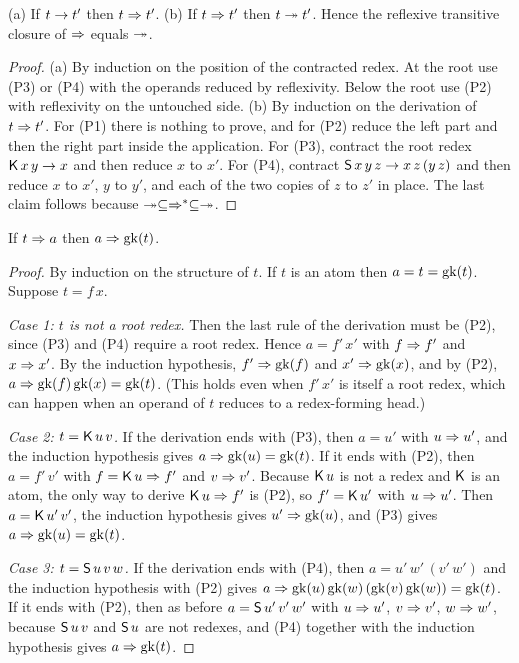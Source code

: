 \begin{lemma}[Inclusions]\label{lem:inclusions}
(a) If $t\rightarrow t'$ then $t\Rightarrow t'$. (b) If $t\Rightarrow t'$ then $t\twoheadrightarrow t'$. Hence the reflexive transitive closure of $\Rightarrow$ equals $\twoheadrightarrow$.
\end{lemma}

\begin{proof}
(a) By induction on the position of the contracted redex. At the root use (P3) or (P4) with the operands reduced by reflexivity. Below the root use (P2) with reflexivity on the untouched side. (b) By induction on the derivation of $t\Rightarrow t'$. For (P1) there is nothing to prove, and for (P2) reduce the left part and then the right part inside the application. For (P3), contract the root redex $\mathsf{K}\,x\,y\rightarrow x$ and then reduce $x$ to $x'$. For (P4), contract $\mathsf{S}\,x\,y\,z\rightarrow x\,z\,(y\,z)$ and then reduce $x$ to $x'$, $y$ to $y'$, and each of the two copies of $z$ to $z'$ in place. The last claim follows because $\twoheadrightarrow\subseteq\Rightarrow^*\subseteq\twoheadrightarrow$.
\end{proof}

\begin{lemma}\label{lem:triangle}
If $t\Rightarrow a$ then $a\Rightarrow\mathrm{gk}(t)$.
\end{lemma}

\begin{proof}
By induction on the structure of $t$. If $t$ is an atom then $a=t=\mathrm{gk}(t)$. Suppose $t=f\,x$.

\emph{Case 1: $t$ is not a root redex.} Then the last rule of the derivation must be (P2), since (P3) and (P4) require a root redex. Hence $a=f'\,x'$ with $f\Rightarrow f'$ and $x\Rightarrow x'$. By the induction hypothesis, $f'\Rightarrow\mathrm{gk}(f)$ and $x'\Rightarrow\mathrm{gk}(x)$, and by (P2), $a\Rightarrow\mathrm{gk}(f)\,\mathrm{gk}(x)=\mathrm{gk}(t)$. (This holds even when $f'\,x'$ is itself a root redex, which can happen when an operand of $t$ reduces to a redex-forming head.)

\emph{Case 2: $t=\mathsf{K}\,u\,v$.} If the derivation ends with (P3), then $a=u'$ with $u\Rightarrow u'$, and the induction hypothesis gives $a\Rightarrow\mathrm{gk}(u)=\mathrm{gk}(t)$. If it ends with (P2), then $a=f'\,v'$ with $f=\mathsf{K}\,u\Rightarrow f'$ and $v\Rightarrow v'$. Because $\mathsf{K}\,u$ is not a redex and $\mathsf{K}$ is an atom, the only way to derive $\mathsf{K}\,u\Rightarrow f'$ is (P2), so $f'=\mathsf{K}\,u'$ with $u\Rightarrow u'$. Then $a=\mathsf{K}\,u'\,v'$, the induction hypothesis gives $u'\Rightarrow\mathrm{gk}(u)$, and (P3) gives $a\Rightarrow\mathrm{gk}(u)=\mathrm{gk}(t)$.

\emph{Case 3: $t=\mathsf{S}\,u\,v\,w$.} If the derivation ends with (P4), then $a=u'\,w'\,(v'\,w')$ and the induction hypothesis with (P2) gives $a\Rightarrow\mathrm{gk}(u)\,\mathrm{gk}(w)\,(\mathrm{gk}(v)\,\mathrm{gk}(w))=\mathrm{gk}(t)$. If it ends with (P2), then as before $a=\mathsf{S}\,u'\,v'\,w'$ with $u\Rightarrow u'$, $v\Rightarrow v'$, $w\Rightarrow w'$, because $\mathsf{S}\,u\,v$ and $\mathsf{S}\,u$ are not redexes, and (P4) together with the induction hypothesis gives $a\Rightarrow\mathrm{gk}(t)$.
\end{proof}

